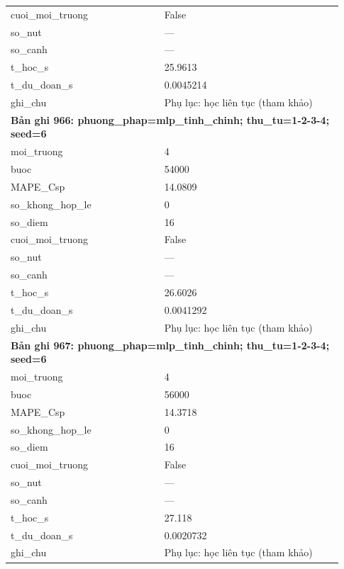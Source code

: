 \begin{longtable}{p{0.43\linewidth}p{0.50\linewidth}}
cuoi\_\allowbreak moi\_\allowbreak truong & False \\
so\_\allowbreak nut & — \\
so\_\allowbreak canh & — \\
t\_\allowbreak hoc\_\allowbreak s & 25.9613 \\
t\_\allowbreak du\_\allowbreak doan\_\allowbreak s & 0.0045214 \\
ghi\_\allowbreak chu & Phụ lục: học liên tục (tham khảo) \\
\midrule
\multicolumn{2}{p{0.95\linewidth}}{\textbf{Bản ghi 966: phuong\_phap=mlp\_tinh\_chinh; thu\_tu=1-2-3-4; seed=6}} \\
moi\_\allowbreak truong & 4 \\
buoc & 54000 \\
MAPE\_\allowbreak Csp & 14.0809 \\
so\_\allowbreak khong\_\allowbreak hop\_\allowbreak le & 0 \\
so\_\allowbreak diem & 16 \\
cuoi\_\allowbreak moi\_\allowbreak truong & False \\
so\_\allowbreak nut & — \\
so\_\allowbreak canh & — \\
t\_\allowbreak hoc\_\allowbreak s & 26.6026 \\
t\_\allowbreak du\_\allowbreak doan\_\allowbreak s & 0.0041292 \\
ghi\_\allowbreak chu & Phụ lục: học liên tục (tham khảo) \\
\midrule
\multicolumn{2}{p{0.95\linewidth}}{\textbf{Bản ghi 967: phuong\_phap=mlp\_tinh\_chinh; thu\_tu=1-2-3-4; seed=6}} \\
moi\_\allowbreak truong & 4 \\
buoc & 56000 \\
MAPE\_\allowbreak Csp & 14.3718 \\
so\_\allowbreak khong\_\allowbreak hop\_\allowbreak le & 0 \\
so\_\allowbreak diem & 16 \\
cuoi\_\allowbreak moi\_\allowbreak truong & False \\
so\_\allowbreak nut & — \\
so\_\allowbreak canh & — \\
t\_\allowbreak hoc\_\allowbreak s & 27.118 \\
t\_\allowbreak du\_\allowbreak doan\_\allowbreak s & 0.0020732 \\
ghi\_\allowbreak chu & Phụ lục: học liên tục (tham khảo) \\

\end{longtable}
